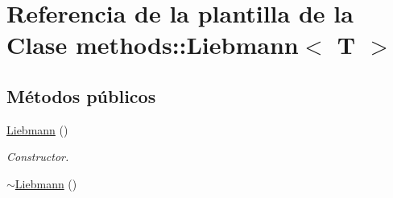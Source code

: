 \hypertarget{classmethods_1_1Liebmann}{}\section{Referencia de la plantilla de la Clase methods\+:\+:Liebmann$<$ T $>$}
\label{classmethods_1_1Liebmann}
\subsection*{Métodos públicos}
\begin{DoxyCompactItemize}
\item 
\hyperlink{classmethods_1_1Liebmann_a7a095aca7a7556f4eec22c2c3528f436}{Liebmann} ()\hypertarget{classmethods_1_1Liebmann_a7a095aca7a7556f4eec22c2c3528f436}{}\label{classmethods_1_1Liebmann_a7a095aca7a7556f4eec22c2c3528f436}

\begin{DoxyCompactList}\small\item\em Constructor. \end{DoxyCompactList}\item 
\hyperlink{classmethods_1_1Liebmann_a2f2d48f06aeb92dcbcb0e73774ffb200}{$\sim$\+Liebmann} ()\hypertarget{classmethods_1_1Liebmann_a2f2d48f06aeb92dcbcb0e73774ffb200}{}\label{classmethods_1_1Liebmann_a2f2d48f06aeb92dcbcb0e73774ffb200}


\end{DoxyCompactItemize}
